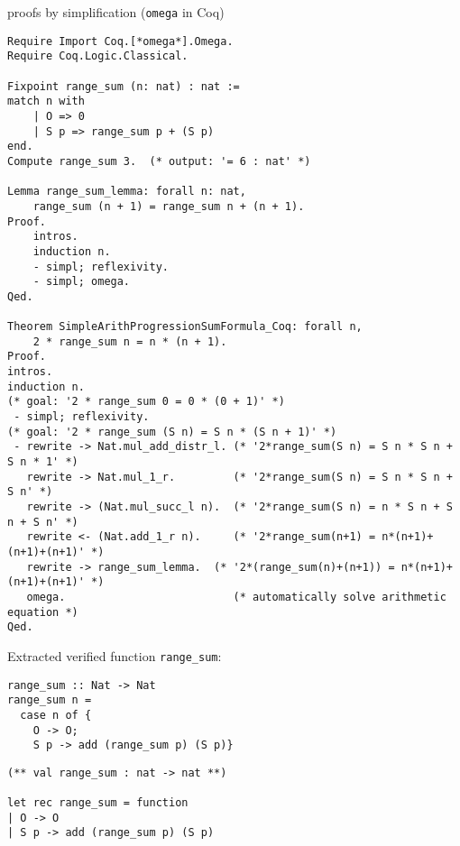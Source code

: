 \documentclass[article]{aaltoseries}
\begin{document}
proofs by simplification (\texttt{omega} in Coq)
\begin{lstlisting}[language=coq]
Require Import Coq.[*omega*].Omega.
Require Coq.Logic.Classical.

Fixpoint range_sum (n: nat) : nat :=
match n with
    | O => 0
    | S p => range_sum p + (S p)
end.
Compute range_sum 3.  (* output: '= 6 : nat' *)

Lemma range_sum_lemma: forall n: nat,
    range_sum (n + 1) = range_sum n + (n + 1).
Proof.
    intros.
    induction n.
    - simpl; reflexivity.
    - simpl; omega.
Qed.

Theorem SimpleArithProgressionSumFormula_Coq: forall n,
    2 * range_sum n = n * (n + 1).
Proof.
intros.
induction n.
(* goal: '2 * range_sum 0 = 0 * (0 + 1)' *)
 - simpl; reflexivity.
(* goal: '2 * range_sum (S n) = S n * (S n + 1)' *)
 - rewrite -> Nat.mul_add_distr_l. (* '2*range_sum(S n) = S n * S n + S n * 1' *)
   rewrite -> Nat.mul_1_r.         (* '2*range_sum(S n) = S n * S n + S n' *)
   rewrite -> (Nat.mul_succ_l n).  (* '2*range_sum(S n) = n * S n + S n + S n' *)
   rewrite <- (Nat.add_1_r n).     (* '2*range_sum(n+1) = n*(n+1)+(n+1)+(n+1)' *)
   rewrite -> range_sum_lemma.  (* '2*(range_sum(n)+(n+1)) = n*(n+1)+(n+1)+(n+1)' *)
   omega.                          (* automatically solve arithmetic equation *)
Qed.
\end{lstlisting}


Extracted verified function \texttt{range\_sum}:

\begin{minipage}{.45\columnwidth}
\begin{lstlisting}[caption={Extracted function in Haskell},frame=none]
range_sum :: Nat -> Nat
range_sum n =
  case n of {
    O -> O;
    S p -> add (range_sum p) (S p)}
\end{lstlisting}
\end{minipage}
\begin{minipage}{.45\columnwidth}
\begin{lstlisting}[caption={Extracted function in OCaml},frame=none]
(** val range_sum : nat -> nat **)

let rec range_sum = function
| O -> O
| S p -> add (range_sum p) (S p)
\end{lstlisting}
\end{minipage}
\end{document}
